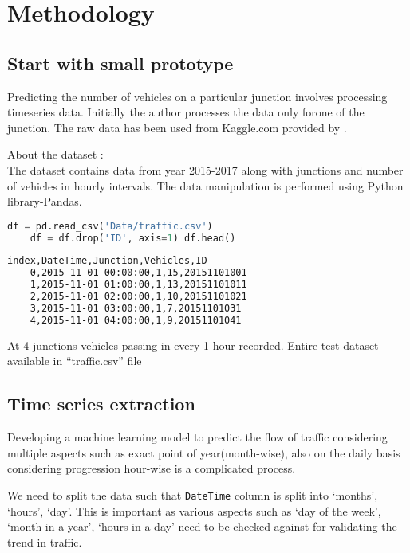 \chapter{Methodology}

\section{Start with small prototype}

Predicting the number of vehicles on a particular junction involves processing timeseries data. Initially the author processes the data only forone of the junction. The raw data has been used from Kaggle.com provided by  \parencite{fedesoriano}.

About the dataset : \\
The dataset contains data from year 2015-2017 along with junctions and number of vehicles in hourly intervals.
The data manipulation is performed using Python library-Pandas.

\begin{lstlisting}[language=Python,caption={Data set fetching using Pandas},label={code:data}]
    df = pd.read_csv('Data/traffic.csv')
    df = df.drop('ID', axis=1) df.head()
\end{lstlisting}

\begin{lstlisting}[language=Bash,caption={Sample Result},label={code:confusion matrix}]
    index,DateTime,Junction,Vehicles,ID
    0,2015-11-01 00:00:00,1,15,20151101001
    1,2015-11-01 01:00:00,1,13,20151101011
    2,2015-11-01 02:00:00,1,10,20151101021
    3,2015-11-01 03:00:00,1,7,20151101031
    4,2015-11-01 04:00:00,1,9,20151101041
\end{lstlisting}

At 4 junctions vehicles passing in every 1 hour recorded. Entire test dataset available in  ``traffic.csv'' file

\section{Time series extraction}

Developing a machine learning model to predict the flow of traffic considering multiple aspects such as exact point of year(month-wise), also on the daily basis considering progression hour-wise is a complicated process.

We need to split the data such that \texttt{DateTime} column is split into `months', `hours', `day'. This is important as various aspects such as `day of the week', `month in a year', `hours in a day' need to be checked against for validating the trend in traffic.

